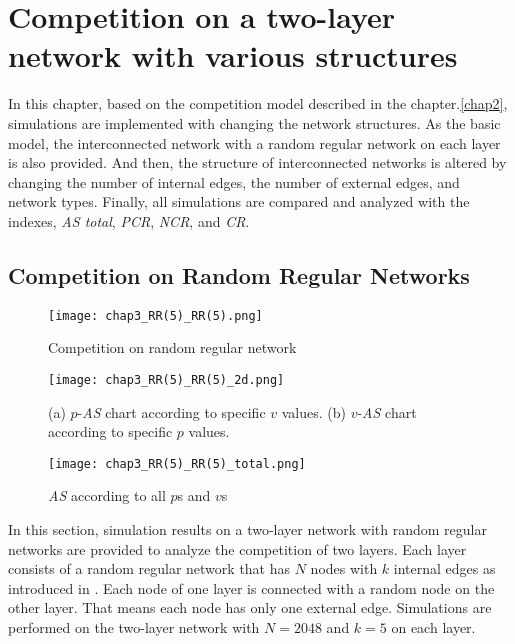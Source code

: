

\chapter{Competition on a two-layer network with various structures}
\label{chap3}
In this chapter, based on the competition model described in the chapter.\ref{chap2}, simulations are implemented with changing the network structures. As the basic model, the interconnected network with a random regular network on each layer is also provided. And then, the structure of interconnected networks is altered by changing the number of internal edges, the number of external edges, and network types. Finally, all simulations are compared and analyzed with the indexes, \textit{AS total}, \textit{PCR}, \textit{NCR}, and \textit{CR}.\\

\section{Competition on Random Regular Networks}
\label{competition on Random Regular Networks}
\begin{figure}[!htb]
	\centering
	\texttt{[image: chap3\_RR(5)\_RR(5).png]}
	\caption{Competition on random regular network}
	\label{chap3_RR(5)_RR(5)}
\end{figure}
\begin{figure}[!htb]
	\centering
	\texttt{[image: chap3\_RR(5)\_RR(5)\_2d.png]}
	\caption{(a) $p$-\textit{AS} chart according to specific $v$ values. (b) $v$-\textit{AS} chart according to specific $p$ values.}
	\label{chap3_RR(5)_RR(5)_2d}
\end{figure}
\begin{figure}[!htb]
	\centering
	\texttt{[image: chap3\_RR(5)\_RR(5)\_total.png]}
	\caption{\textit{AS} according to all $p$s and $v$s}
	\label{chap3_RR(5)_RR(5)_total}
\end{figure}
In this section, simulation results on a two-layer network with random regular networks are provided to analyze the competition of two layers. Each layer consists of a random regular network that has $N$ nodes with $k$ internal edges as introduced in \parencite{kimsangwoo2012, choi2011, bela2001}. Each node of one layer is connected with a random node on the other layer. That means each node has only one external edge. Simulations are performed on the two-layer network with $N=2048$ and $k=5$ on each layer.

